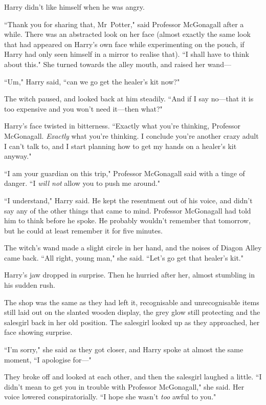 Harry didn't like himself when he was angry.

``Thank you for sharing that, Mr~Potter," said Professor McGonagall after a while. There was an abstracted look on her face (almost exactly the same look that had appeared on Harry's own face while experimenting on the pouch, if Harry had only seen himself in a mirror to realise that). ``I shall have to think about this." She turned towards the alley mouth, and raised her wand—

``Um," Harry said, ``can we go get the healer's kit now?"

The witch paused, and looked back at him steadily. ``And if I say no—that it is too expensive and you won't need it—then what?"

Harry's face twisted in bitterness. ``Exactly what you're thinking, Professor McGonagall. \emph{Exactly} what you're thinking. I conclude you're another crazy adult I can't talk to, and I start planning how to get my hands on a healer's kit anyway."

``I am your guardian on this trip," Professor McGonagall said with a tinge of danger. ``I \emph{will not} allow you to push me around."

``I understand," Harry said. He kept the resentment out of his voice, and didn't say any of the other things that came to mind. Professor McGonagall had told him to think before he spoke. He probably wouldn't remember that tomorrow, but he could at least remember it for five minutes.

The witch's wand made a slight circle in her hand, and the noises of Diagon Alley came back. ``All right, young man," she said. ``Let's go get that healer's kit."

Harry's jaw dropped in surprise. Then he hurried after her, almost stumbling in his sudden rush.

\later

The shop was the same as they had left it, recognisable and unrecognisable items still laid out on the slanted wooden display, the grey glow still protecting and the salesgirl back in her old position. The salesgirl looked up as they approached, her face showing surprise.

``I'm sorry," she said as they got closer, and Harry spoke at almost the same moment, ``I apologise for—"

They broke off and looked at each other, and then the salesgirl laughed a little. ``I didn't mean to get you in trouble with Professor McGonagall," she said. Her voice lowered conspiratorially. ``I hope she wasn't \emph{too} awful to you."

